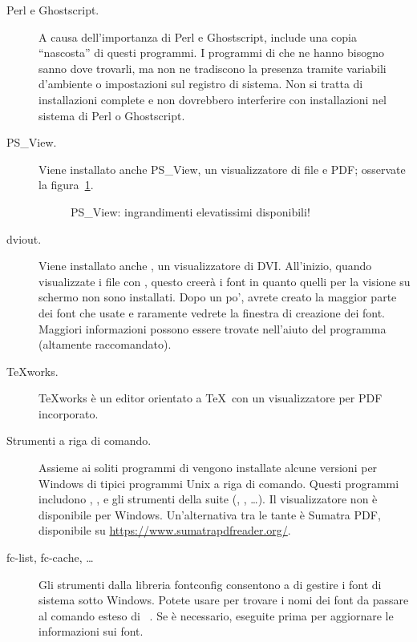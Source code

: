 \documentclass{article}
\begin{document}
\begin{description}
\item[Perl e Ghostscript.] A causa dell'importanza di Perl e Ghostscript,
  \TL{} include una copia ``nascosta'' di questi programmi. I programmi di
  \TL{} che ne hanno bisogno sanno dove trovarli, ma non ne tradiscono la
  presenza tramite variabili d'ambiente o impostazioni sul registro di
  sistema. Non si tratta di installazioni complete e non dovrebbero
  interferire con installazioni nel sistema di Perl o Ghostscript.

\item[PS\_View.] Viene installato anche PS\_View, un visualizzatore di
  file \PS{} e PDF; osservate la figura~\ref{fig:psview}.

\begin{figure}[tb]
\caption{PS\_View: ingrandimenti elevatissimi disponibili!}
\label{fig:psview}
\end{figure}

\item[dviout.] Viene installato anche , un visualizzatore di
  DVI. All'inizio, quando visualizzate i file con ,
  questo creerà i font in quanto quelli per la visione su schermo non sono
  installati. Dopo un po', avrete creato la maggior parte dei font che
  usate e raramente vedrete la finestra di creazione dei font. Maggiori
  informazioni possono essere trovate nell'aiuto del programma (altamente
  raccomandato).

\item[\TeX{}works.] \TeX{}works è un editor orientato a \TeX\ con un
  visualizzatore per PDF incorporato.

\item[Strumenti a riga di comando.] Assieme ai soliti programmi di \TL{}
  vengono installate alcune versioni per Windows di tipici programmi Unix
  a riga di comando. Questi programmi includono ,
  ,  e gli strumenti della suite 
  (, , \ldots). Il visualizzatore
   non è disponibile per Windows. Un'alternativa tra le tante è 
  Sumatra PDF, disponibile su
  \url{https://www.sumatrapdfreader.org/}.

\item[fc-list, fc-cache, \ldots] Gli strumenti dalla libreria fontconfig
  consentono a \XeTeX{} di gestire i font di sistema sotto Windows. Potete
  usare  per trovare i nomi dei font da passare al comando
  esteso di \XeTeX\ . Se è necessario, eseguite prima
   per aggiornare le informazioni sui font.

\end{description}
\end{document}
